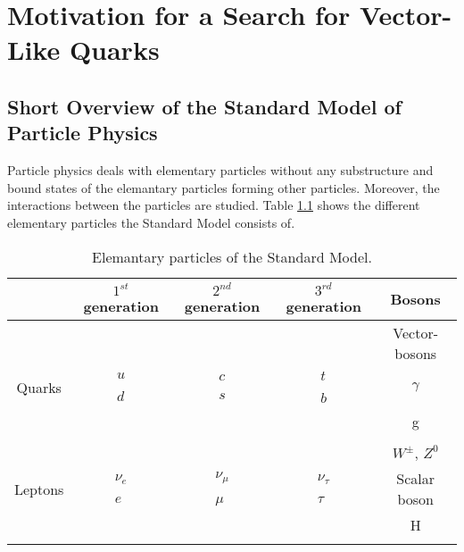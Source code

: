\chapter{Motivation for a Search for Vector-Like Quarks}




\section{Short Overview of the Standard Model of Particle Physics}
Particle physics deals with elementary particles without any substructure and bound states of the elemantary particles forming other particles.
Moreover, the interactions between the particles  are studied.
Table \ref{standardmodel} shows the different elementary particles the Standard Model consists of.

\begin{table}
\centering
\begin{tabular}{|c|c c c|c|} 
\hline
 & $1^{st}$ generation & $2^{nd}$ generation & $3^{rd}$ generation &  Bosons \\
\hline
\hline
&	&	&	& \small{Vector-bosons}	\\
Quarks &  $\begin{matrix} u \\ \\ d \end{matrix}$ & $\begin{matrix} c \\ \\ s \end{matrix}$ & $\begin{matrix} t \\ \\ b \end{matrix}$ & $\gamma$ \\
& & & & g  \\
&	&	&	&	\\
& &  &  & $W^{\pm}$, $Z^{0}$ \\
Leptons & $\begin{matrix} \nu_{e} \\ \\ e \end{matrix}$ & $\begin{matrix} \nu_{\mu} \\ \\ \mu \end{matrix}$ & $\begin{matrix} \nu_{\tau} \\ \\ \tau \end{matrix}$ & \small{Scalar boson}  \\
&	&	&	&   H \\
&	&	&	&     \\
 \hline
\end{tabular}
\caption{Elemantary particles of the Standard Model.}
\label{standardmodel}
\end{table}



